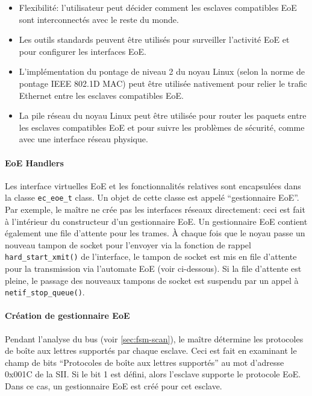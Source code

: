 \documentclass[a4paper,12pt,BCOR=6mm,bibtotoc,idxtotoc]{scrbook}
\begin{document}
\begin{itemize}

\item Flexibilit\'e: l'utilisateur peut d\'ecider comment les esclaves
  compatibles EoE sont interconnect\'es avec le reste du monde.

\item Les outils standards peuvent \^etre utilis\'es pour surveiller
  l'activit\'e EoE et pour configurer les interfaces EoE.

\item L'impl\'ementation du pontage de niveau 2 du noyau Linux (selon la
  norme de pontage IEEE 802.1D MAC) peut \^etre utilis\'ee nativement pour
  relier le trafic Ethernet entre les esclaves compatibles EoE.

\item La pile r\'eseau du noyau Linux peut \^etre utilis\'ee pour router les
  paquets entre les esclaves compatibles EoE et pour suivre les
  probl\`emes de s\'ecurit\'e, comme avec une interface r\'eseau physique.

\end{itemize}

\paragraph{EoE Handlers}

Les interface virtuelles EoE et les fonctionnalit\'es relatives sont
encapsul\'ees dans la classe \lstinline+ec_eoe_t+ class.  Un objet de
cette classe est appel\'e ``gestionnaire EoE''.  Par exemple, le ma\^itre
ne cr\'ee pas les interfaces r\'eseaux directement: ceci est fait \`a
l'int\'erieur du constructeur d'un gestionnaire EoE.  Un gestionnaire
EoE contient \'egalement une file d'attente pour les trames.  \`A chaque
fois que le noyau passe un nouveau tampon de socket pour l'envoyer via la
fonction de rappel \lstinline+hard_start_xmit()+ de l'interface, le
tampon de socket est mis en file d'attente pour la transmission via
l'automate EoE (voir ci-dessous).  Si la file d'attente est pleine, le
passage des nouveaux tampons de socket est suspendu par un appel \`a
\lstinline+netif_stop_queue()+.

\paragraph{Cr\'eation de gestionnaire EoE}

Pendant l'analyse du bus (voir \autoref{sec:fsm-scan}), le ma\^itre
d\'etermine les protocoles de bo\^ite aux lettres support\'es par chaque
esclave. Ceci est fait en examinant le champ de bits ``Protocoles de
bo\^ite aux lettres support\'es'' au mot d'adresse 0x001C de la SII. Si le
bit 1 est d\'efini, alors l'esclave supporte le protocole EoE. Dans ce
cas, un gestionnaire EoE est cr\'e\'e pour cet esclave.
\end{document}
